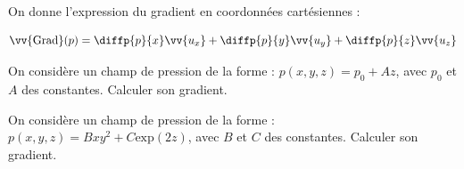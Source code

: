 On donne l'expression du gradient en coordonnées cartésiennes : 

$$\vv{\text{Grad}}(p)=\diffp{p}{x}\vv{u_x}+\diffp{p}{y}\vv{u_y}+\diffp{p}{z}\vv{u_z}$$

\debutEntrainement




\begin{enonce}
On considère un champ de pression de la forme : $p(x,y,z)=p_0+Az$, avec $p_0$ et $A$ des constantes. Calculer son gradient.
\end{enonce}









\begin{enonce}
On considère un champ de pression de la forme : $p(x,y,z)=Bxy^2+C\text{exp}(2z)$, avec $B$ et $C$ des constantes. Calculer son gradient.
\end{enonce}





\finEntrainement










\afficheReponsesMelangees

